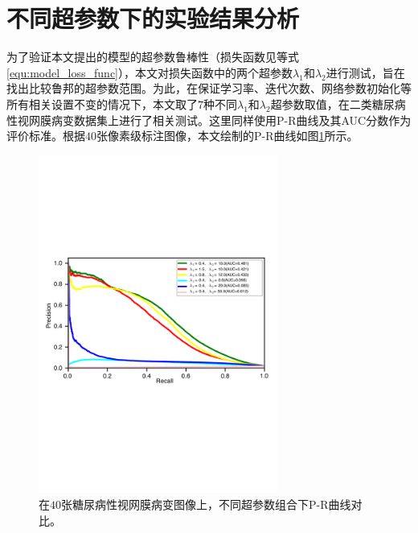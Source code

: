
\section{不同超参数下的实验结果分析}\label{sec:hyper_paras}
为了验证本文提出的模型的超参数鲁棒性（损失函数见等式\ref{equ:model_loss_func}），本文对损失函数中的两个超参数$\lambda_{1}$和$\lambda_{2}$进行测试，旨在找出比较鲁邦的超参数范围。为此，在保证学习率、迭代次数、网络参数初始化等所有相关设置不变的情况下，本文取了$7$种不同$\lambda_{1}$和$\lambda_{2}$超参数取值，在二类糖尿病性视网膜病变数据集上进行了相关测试。这里同样使用P-R曲线及其AUC分数作为评价标准。根据$40$张像素级标注图像，本文绘制的P-R曲线如图\ref{fig:pr_curve_retinal_hyper_paras}所示。
\begin{figure}[h]
	\centering
	\includegraphics[width=0.7\textwidth]{figure/pr_curve_retinal_hyper_paras/pr_curve.pdf}
	\caption[不同超参数组合下P-R曲线对比]{在$40$张糖尿病性视网膜病变图像上，不同超参数组合下P-R曲线对比。}
	\label{fig:pr_curve_retinal_hyper_paras}
\end{figure}

